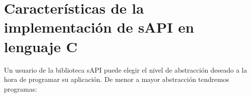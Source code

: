 

\section{Características de la implementación de sAPI en lenguaje C}
\label{sec:codeImplemC}

Un usuario de la biblioteca sAPI puede elegir el nivel de abstracción deseado a la hora de programar su aplicación. De menor a mayor abstracción tendremos programas:

